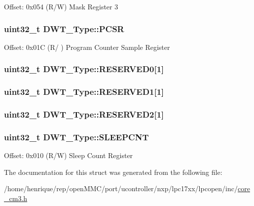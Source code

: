 Offset\-: 0x054 (R/\-W) Mask Register 3 \hypertarget{structDWT__Type_abc5ae11d98da0ad5531a5e979a3c2ab5}{
\subsubsection[{P\-C\-S\-R}]{ uint32\-\_\-t D\-W\-T\-\_\-\-Type\-::\-P\-C\-S\-R}}\label{structDWT__Type_abc5ae11d98da0ad5531a5e979a3c2ab5}
Offset\-: 0x01\-C (R/ ) Program Counter Sample Register \hypertarget{structDWT__Type_addd893d655ed90d40705b20170daac59}{
\subsubsection[{R\-E\-S\-E\-R\-V\-E\-D0}]{\setlength{\rightskip}{0pt plus 5cm}uint32\-\_\-t D\-W\-T\-\_\-\-Type\-::\-R\-E\-S\-E\-R\-V\-E\-D0\mbox{[}1\mbox{]}}}\label{structDWT__Type_addd893d655ed90d40705b20170daac59}
\hypertarget{structDWT__Type_a069871233a8c1df03521e6d7094f1de4}{
\subsubsection[{R\-E\-S\-E\-R\-V\-E\-D1}]{\setlength{\rightskip}{0pt plus 5cm}uint32\-\_\-t D\-W\-T\-\_\-\-Type\-::\-R\-E\-S\-E\-R\-V\-E\-D1\mbox{[}1\mbox{]}}}\label{structDWT__Type_a069871233a8c1df03521e6d7094f1de4}
\hypertarget{structDWT__Type_a8556ca1c32590517602d92fe0cd55738}{
\subsubsection[{R\-E\-S\-E\-R\-V\-E\-D2}]{\setlength{\rightskip}{0pt plus 5cm}uint32\-\_\-t D\-W\-T\-\_\-\-Type\-::\-R\-E\-S\-E\-R\-V\-E\-D2\mbox{[}1\mbox{]}}}\label{structDWT__Type_a8556ca1c32590517602d92fe0cd55738}
\hypertarget{structDWT__Type_a8afd5a4bf994011748bc012fa442c74d}{
\subsubsection[{S\-L\-E\-E\-P\-C\-N\-T}]{ uint32\-\_\-t D\-W\-T\-\_\-\-Type\-::\-S\-L\-E\-E\-P\-C\-N\-T}}\label{structDWT__Type_a8afd5a4bf994011748bc012fa442c74d}
Offset\-: 0x010 (R/\-W) Sleep Count Register 

The documentation for this struct was generated from the following file\-:\begin{DoxyCompactItemize}
\item 
/home/henrique/rep/open\-M\-M\-C/port/ucontroller/nxp/lpc17xx/lpcopen/inc/\hyperlink{core__cm3_8h}{core\-\_\-cm3.\-h}\end{DoxyCompactItemize}
